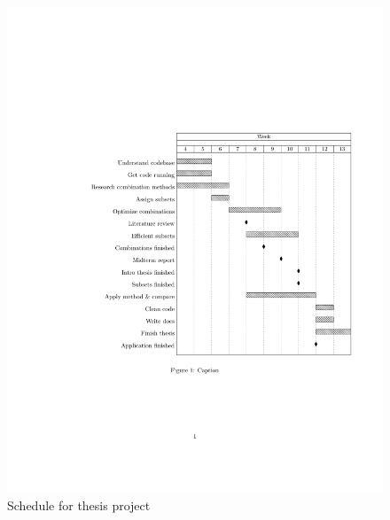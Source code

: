\documentclass[11pt]{article}
\begin{document}
\begin{figure}[!ht]
        \centering
        \includegraphics[width=\textwidth]{ScriptieOpdrachten.pdf}
        \caption{Schedule for thesis project}
        \label{fig:my_label}
    \end{figure}


 
\end{document}
